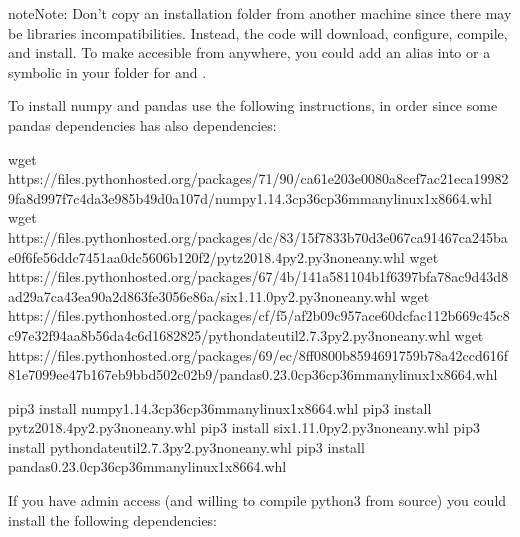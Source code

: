 \documentclass[letterpaper,10pt,english]{sphinxmanual}
\begin{document}
\begin{sphinxadmonition}{note}{Note:}
Don’t copy an installation folder from another machine since there may be
libraries incompatibilities. Instead, the code will download, configure,
compile, and install. To make accesible from anywhere, you could add an
alias into  or a symbolic in your  folder for
 and .
\end{sphinxadmonition}

To install numpy and pandas use the following instructions, in order since some
pandas dependencies has also dependencies:

\begin{sphinxVerbatim}[commandchars=\\\{\}]
wget https://files.pythonhosted.org/packages/71/90/ca61e203e0080a8cef7ac21eca199829fa8d997f7c4da3e985b49d0a107d/numpy\PYGZhy{}1.14.3\PYGZhy{}cp36\PYGZhy{}cp36m\PYGZhy{}manylinux1\PYGZus{}x86\PYGZus{}64.whl
wget https://files.pythonhosted.org/packages/dc/83/15f7833b70d3e067ca91467ca245bae0f6fe56ddc7451aa0dc5606b120f2/pytz\PYGZhy{}2018.4\PYGZhy{}py2.py3\PYGZhy{}none\PYGZhy{}any.whl
wget https://files.pythonhosted.org/packages/67/4b/141a581104b1f6397bfa78ac9d43d8ad29a7ca43ea90a2d863fe3056e86a/six\PYGZhy{}1.11.0\PYGZhy{}py2.py3\PYGZhy{}none\PYGZhy{}any.whl
wget https://files.pythonhosted.org/packages/cf/f5/af2b09c957ace60dcfac112b669c45c8c97e32f94aa8b56da4c6d1682825/python\PYGZus{}dateutil\PYGZhy{}2.7.3\PYGZhy{}py2.py3\PYGZhy{}none\PYGZhy{}any.whl
wget https://files.pythonhosted.org/packages/69/ec/8ff0800b8594691759b78a42ccd616f81e7099ee47b167eb9bbd502c02b9/pandas\PYGZhy{}0.23.0\PYGZhy{}cp36\PYGZhy{}cp36m\PYGZhy{}manylinux1\PYGZus{}x86\PYGZus{}64.whl

pip3 install numpy\PYGZhy{}1.14.3\PYGZhy{}cp36\PYGZhy{}cp36m\PYGZhy{}manylinux1\PYGZus{}x86\PYGZus{}64.whl
pip3 install pytz\PYGZhy{}2018.4\PYGZhy{}py2.py3\PYGZhy{}none\PYGZhy{}any.whl
pip3 install six\PYGZhy{}1.11.0\PYGZhy{}py2.py3\PYGZhy{}none\PYGZhy{}any.whl
pip3 install python\PYGZus{}dateutil\PYGZhy{}2.7.3\PYGZhy{}py2.py3\PYGZhy{}none\PYGZhy{}any.whl
pip3 install pandas\PYGZhy{}0.23.0\PYGZhy{}cp36\PYGZhy{}cp36m\PYGZhy{}manylinux1\PYGZus{}x86\PYGZus{}64.whl
\end{sphinxVerbatim}

If you have admin access (and willing to compile python3 from source) you could
install the following dependencies:
\end{document}
